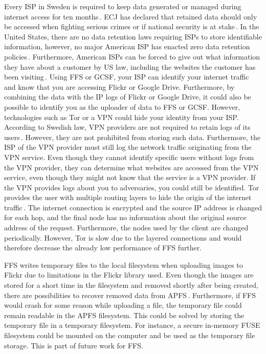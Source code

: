 Every \gls{ISP} in Sweden is required to keep data generated or managed during internet access for ten months\,\cite{post-ochtelestyrelsenFragorOchSvar2019}. \gls{ECJ} has declared that retained data should only be accessed when fighting serious crimes or if national security is at stake\,\cite{EuropeanCourtJustice2017}. In the United States, there are no data retention laws requiring \gls{ISP}s to store identifiable information, however, no major American \gls{ISP} has enacted zero data retention policies\,\cite{lawofficesofsalaratrizadehUnitedStatesData2021}. Furthermore, American \gls{ISP}s can be forced to give out what information they have about a customer by US law, including the websites the customer has been visiting\,\cite{instituteDataRetentionLaws}. Using \gls{FFS} or \gls{GCSF}, your \gls{ISP} can identify your internet traffic and know that you are accessing Flickr or Google Drive. Furthermore, by combining the data with the IP logs of Flickr or Google Drive, it could also be possible to identify you as the uploader of data to \gls{FFS} or \gls{GCSF}. However, technologies such as Tor or a \gls{VPN} could hide your identity from your \gls{ISP}. According to Swedish law, \gls{VPN} providers are not required to retain logs of its users\,\cite{walshInternetCensorshipSweden2020}. However, they are not prohibited from storing such data. Furthermore, the \gls{ISP} of the \gls{VPN} provider must still log the network traffic originating from the \gls{VPN} service. Even though they cannot identify specific users without logs from the \gls{VPN} provider, they can determine what websites are accessed from the \gls{VPN} service, even though they might not know that the service is a \gls{VPN} provider. If the \gls{VPN} provides logs about you to adversaries, you could still be identified. Tor provides the user with multiple routing layers to hide the origin of the internet traffic\,\cite{ramadhaniAnonymityCommunicationVPN2018}. The internet connection is encrypted and the source IP address is changed for each hop, and the final node has no information about the original source address of the request. Furthermore, the nodes used by the client are changed periodically. However, Tor is slow due to the layered connections and would therefore decrease the already low performance of \gls{FFS} further. 

\gls{FFS} writes temporary files to the local filesystem when uploading images to Flickr due to limitations in the Flickr library used. Even though the images are stored for a short time in the filesystem and removed shortly after being created, there are possibilities to recover removed data from \gls{APFS}\,\cite{llcsysdevlaboratoriesHowRecoverData2022,cedricAPFSDataRecovery2022,santosHowRecoverData2021}. Furthermore, if \gls{FFS} would crash for some reason while uploading a file, the temporary file could remain readable in the \gls{APFS} filesystem. This could be solved by storing the temporary file in a temporary filesystem. For instance, a secure in-memory \gls{FUSE} filesystem could be mounted on the computer and be used as the temporary file storage. This is part of future work for \gls{FFS}.

